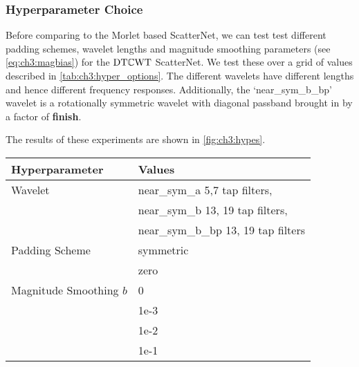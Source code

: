 \subsubsection{Hyperparameter Choice}
Before comparing to the Morlet based ScatterNet, we can test 
test different padding schemes, wavelet lengths and magnitude smoothing parameters (see
\eqref{eq:ch3:magbias}) for the $\mathrm{DT}\mathbb{C}\mathrm{WT}$ ScatterNet. We test these over a grid of values described in
\autoref{tab:ch3:hyper_options}. The different wavelets have different lengths
and hence different frequency responses. Additionally, the `near\_sym\_b\_bp'
wavelet is a rotationally symmetric wavelet with diagonal passband brought in by
a factor of \textbf{finish}.

The results of these experiments are shown in \autoref{fig:ch3:hypes}.

\begin{table}[hbt]
  \centering
  \label{tab:ch3:hyper_options}
  \begin{tabular}{l l}
    \toprule
    Hyperparameter & Values \\
    \midrule
    Wavelet & near\_sym\_a 5,7 tap filters, \\ 
            & near\_sym\_b 13, 19 tap filters,\\
            & near\_sym\_b\_bp 13, 19 tap filters \\\midrule
    Padding Scheme & symmetric \\
                   & zero  \\\midrule
    Magnitude Smoothing $b$ & 0\\
                            & 1e-3 \\
                            & 1e-2 \\
                            & 1e-1 
    \\\bottomrule
  \end{tabular}
\end{table}

\subsubsection{}

